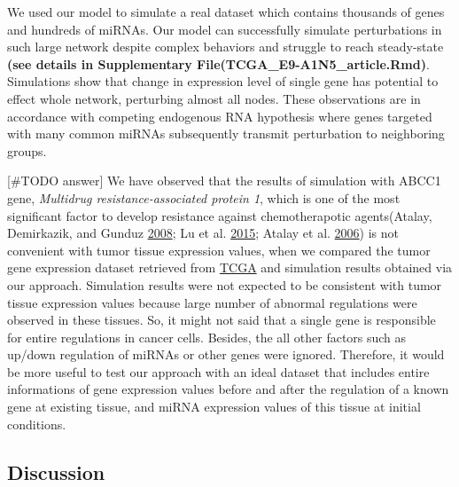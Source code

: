 \documentclass[]{article}
\begin{document}
We used our model to simulate a real dataset which contains thousands of
genes and hundreds of miRNAs. Our model can successfully simulate
perturbations in such large network despite complex behaviors and
struggle to reach steady-state \textbf{(see details in Supplementary
File(TCGA\_E9-A1N5\_article.Rmd)}. Simulations show that change in
expression level of single gene has potential to effect whole network,
perturbing almost all nodes. These observations are in accordance with
competing endogenous RNA hypothesis where genes targeted with many
common miRNAs subsequently transmit perturbation to neighboring groups.

{[}\#TODO answer{]} We have observed that the results of simulation with
ABCC1 gene, \emph{Multidrug resistance-associated protein 1}, which is
one of the most significant factor to develop resistance against
chemotherapotic agents(Atalay, Demirkazik, and Gunduz
\protect\hyperlink{ref-atalay2008role}{2008}; Lu et al.
\protect\hyperlink{ref-lu2015microrna}{2015}; Atalay et al.
\protect\hyperlink{ref-atalay2006multidrug}{2006}) is not convenient
with tumor tissue expression values, when we compared the tumor gene
expression dataset retrieved from
\href{https://www.cancer.gov/about-nci/organization/ccg/research/structural-genomics/tcga}{TCGA}
and simulation results obtained via our approach. Simulation results
were not expected to be consistent with tumor tissue expression values
because large number of abnormal regulations were observed in these
tissues. So, it might not said that a single gene is responsible for
entire regulations in cancer cells. Besides, the all other factors such
as up/down regulation of miRNAs or other genes were ignored. Therefore,
it would be more useful to test our approach with an ideal dataset that
includes entire informations of gene expression values before and after
the regulation of a known gene at existing tissue, and miRNA expression
values of this tissue at initial conditions.

\hypertarget{discussion}{%
\subsection{Discussion}\label{discussion}}
\end{document}
